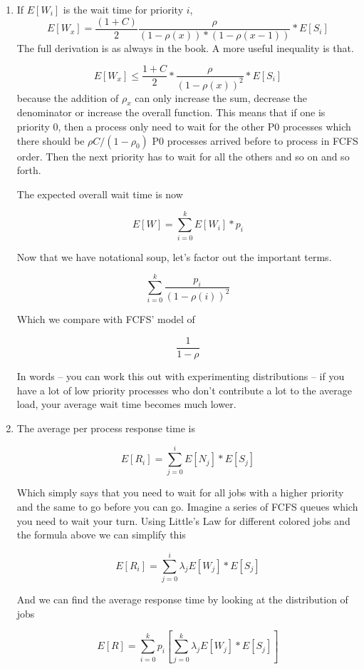 \begin{enumerate}
\item If $E[W_i]$ is the wait time for priority $i$,
  \[
  E[W_x] = \frac{(1 + C)}{2}\frac{\rho}{(1 - \rho(x))*( 1 - \rho(x-1))} * E[S_i]
  \]
    The full derivation is as always in the book.
    A more useful inequality is that.

    \[
    E[W_x] \leq \frac{1 + C}{2}* \frac{\rho}{(1 - \rho(x))^2} * E[S_i]
    \]
    because the addition of $\rho_x$ can only increase the sum, decrease the denominator or increase the overall function.
  This means that if one is priority 0, then a process only need to wait for the other P0 processes which there should be $\rho C/ (1 - \rho_0)$ P0 processes arrived before to process in FCFS order.
  Then the next priority has to wait for all the others and so on and so forth.

  The expected overall wait time is now

  \[
      E[W] = \sum\limits_{i=0}^k E[W_i] * p_i
  \]

  Now that we have notational soup, let's factor out the important terms.

  \[
      \sum\limits_{i=0}^k \frac{p_i}{(1-\rho(i))^2}
  \]

  Which we compare with FCFS' model of

  \[
      \frac{1}{1-\rho}
  \]

  In words -- you can work this out with experimenting distributions -- if you have a lot of low priority processes who don't contribute a lot to the average load, your average wait time becomes much lower.

\item The average per process response time is

  \[
  E[R_i] = \sum\limits_{j = 0}^i E[N_j] * E[S_j]
  \]

  Which simply says that you need to wait for all jobs with a higher priority and the same to go before you can go.
  Imagine a series of FCFS queues which you need to wait your turn.
  Using Little's Law for different colored jobs and the formula above we can simplify this

  \[
      E[R_i] = \sum\limits_{j=0}^i \lambda_j E[W_j] * E[S_j]
  \]

  And we can find the average response time by looking at the distribution of jobs

  \[
      E[R] = \sum\limits_{i=0}^k p_i [\sum\limits_{j=0}^k \lambda_j E[W_j] * E[S_j] ]
  \]


\end{enumerate}
